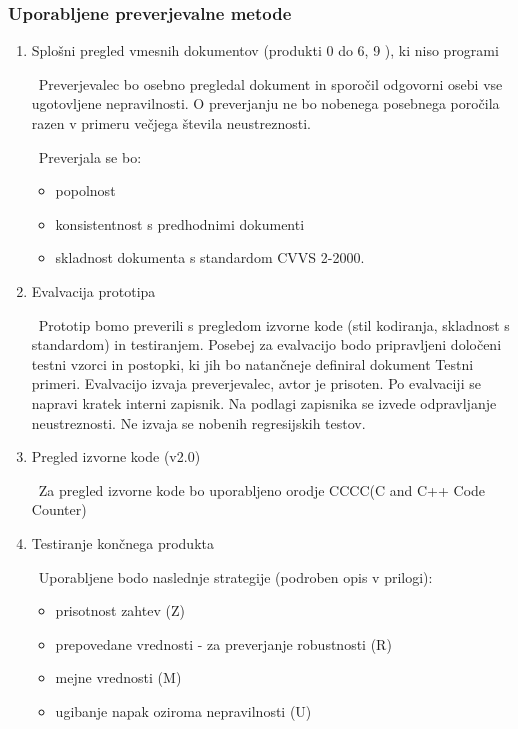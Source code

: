 \documentclass[a4paper,12pt]{article}
\begin{document}
		\subsubsection{Uporabljene preverjevalne metode}

			\begin{enumerate}[label=\alph*)]
				
				\item Splošni pregled vmesnih dokumentov (produkti 0 do 6, 9 ), ki niso programi 

					\ Preverjevalec   bo   osebno   pregledal   dokument   in   sporočil   odgovorni   
					osebi   vse   ugotovljene   nepravilnosti. O preverjanju  ne  bo  nobenega  posebnega  
					poročila  razen  v  primeru  večjega  števila  neustreznosti. 

					\ Preverjala se bo: 
							\begin{itemize}
								\item popolnost  
								\item konsistentnost s predhodnimi dokumenti
								\item skladnost dokumenta s standardom CVVS 2-2000.
							\end{itemize}

				\item Evalvacija prototipa

					\ Prototip  bomo  preverili  s  pregledom  izvorne  kode  (stil  kodiranja,  
					skladnost  s  standardom)  in  testiranjem.  Posebej  za  evalvacijo  bodo  
					pripravljeni  določeni  testni  vzorci  in  postopki,  ki  jih  bo  natančneje  
					definiral  dokument  Testni  primeri.  Evalvacijo  izvaja  preverjevalec,  
					avtor  je  prisoten.  Po  evalvaciji   se   napravi   kratek   interni   
					zapisnik.   Na   podlagi   zapisnika   se   izvede   odpravljanje   
					neustreznosti. Ne izvaja se nobenih regresijskih testov.

				\item Pregled izvorne kode (v2.0)

					\ Za pregled izvorne kode bo uporabljeno orodje CCCC(C and C++ Code Counter)

\newpage

				\item Testiranje končnega produkta 

					\ Uporabljene bodo naslednje strategije (podroben opis v prilogi):

					\begin{itemize}			
						\item prisotnost zahtev (Z)
						\item prepovedane vrednosti - za preverjanje robustnosti (R)
						\item mejne vrednosti (M)
						\item ugibanje napak oziroma nepravilnosti (U)
					\end{itemize}


\end{enumerate}
\end{document}
